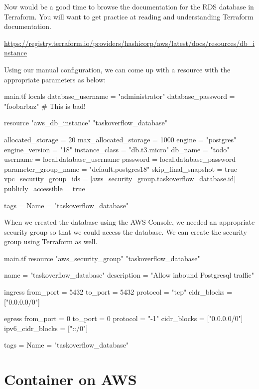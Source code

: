 \documentclass{csse4400}
\begin{document}
Now would be a good time to browse the documentation for the RDS database in Terraform.
You will want to get practice at reading and understanding Terraform documentation.

\noindent \url{https://registry.terraform.io/providers/hashicorp/aws/latest/docs/resources/db_instance}

Using our manual configuration, we can come up with a resource with the appropriate parameters as below:

\begin{code}[language=terraform,numbers=none]{main.tf}
locals {
  database_username = "administrator"
  database_password = "foobarbaz"  # This is bad!
}

resource "aws_db_instance" "taskoverflow_database" {
  allocated_storage      = 20
  max_allocated_storage  = 1000
  engine                 = "postgres"
  engine_version         = "18"
  instance_class         = "db.t3.micro"
  db_name                = "todo"
  username               = local.database_username
  password               = local.database_password
  parameter_group_name   = "default.postgres18"
  skip_final_snapshot    = true
  vpc_security_group_ids = [aws_security_group.taskoverflow_database.id]
  publicly_accessible    = true

  tags = {
    Name = "taskoverflow_database"
  }
}
\end{code}

When we created the database using the AWS Console,
we needed an appropriate security group so that we could access the database.
We can create the security group using Terraform as well.

\begin{code}[language=terraform,numbers=none]{main.tf}
resource "aws_security_group" "taskoverflow_database" {
  name        = "taskoverflow_database"
  description = "Allow inbound Postgresql traffic"

  ingress {
    from_port        = 5432
    to_port          = 5432
    protocol         = "tcp"
    cidr_blocks      = ["0.0.0.0/0"]
  }

  egress {
    from_port        = 0
    to_port          = 0
    protocol         = "-1"
    cidr_blocks      = ["0.0.0.0/0"]
    ipv6_cidr_blocks = ["::/0"]
  }

  tags = {
    Name = "taskoverflow_database"
  }
}
\end{code}


\section{Container on AWS}
\end{document}
